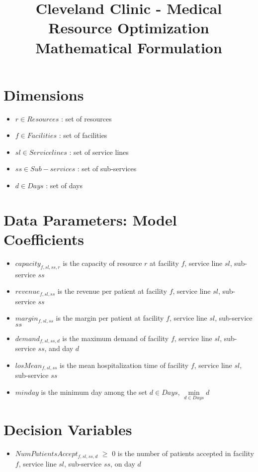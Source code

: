 \documentclass[10pt, letterpaper]{article}
\begin{document}
\title{Cleveland Clinic - Medical Resource Optimization Mathematical Formulation}
\maketitle


\section*{Dimensions}
\begin{itemize}
\item[ ] $ r \in Resources$ : set of resources
\item[ ] $ f \in Facilities$ : set of facilities
\item[ ] $ sl \in Service lines$ : set of service lines
\item[ ] $ ss \in Sub-services$ : set of sub-services
\item[ ] $ d \in Days$ : set of days
\end{itemize}

\section*{Data Parameters: Model Coefficients}
\begin{itemize}
\item[ ] $capacity_{f,sl,ss,r}$  is the capacity of resource $r$ at facility $f$, service line $sl$, sub-service $ss$
\item[ ] $revenue_{f,sl,ss}$  is the revenue per patient at facility $f$, service line $sl$, sub-service $ss$
\item[ ] $margin_{f,sl,ss}$  is the margin per patient at facility $f$, service line $sl$, sub-service $ss$
\item[ ] $demand_{f,sl,ss,d}$  is the maximum demand of facility $f$, service line $sl$, sub-service $ss$, and day $d$
\item[ ] $losMean_{f,sl,ss}$  is the mean hospitalization time of facility $f$, service line $sl$, sub-service $ss$
\item[ ] $minday$ is the minimum day among the set $ d \in Days$, ${\min\limits_{d \in Days} d}$
\end{itemize}

\section*{Decision Variables}
\begin{itemize}
\item [ ] $NumPatientsAccept_{f,sl,ss,d}$ $\geq$ {0} is the number of patients accepted in facility $f$, service line $sl$, sub-service $ss$, on day $d$
\end{itemize}
\end{document}
